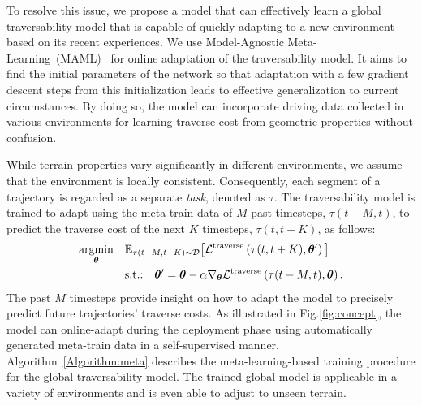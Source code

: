 To resolve this issue, we propose a model that can effectively learn a global traversability model that is capable of quickly adapting to a new environment based on its recent experiences. We use Model-Agnostic Meta-Learning~(MAML)~\cite{finn2017model} for online adaptation of the traversability model. It aims to find the initial parameters of the network so that adaptation with a few gradient descent steps from this initialization leads to effective generalization to current circumstances. By doing so, the model can incorporate driving data collected in various environments for learning traverse cost from geometric properties without confusion.



While terrain properties vary significantly in different environments, we assume that the environment is locally consistent. Consequently, each segment of a trajectory is regarded as a separate \textit{task}, denoted as $\tau$. The traversability model is trained to adapt using the meta-train data of $M$ past timesteps, $\tau\left(t-M,t\right)$, to predict the traverse cost of the next $K$ timesteps, $\tau\left(t,t+K\right)$, as follows: 
\begin{equation}\label{eq:meta}
    \begin{aligned}
    \argmin_{\bm{\theta}} \hspace{10pt} & \mathbb{E}_{\tau\left(t-M, t+K\right) \sim \mathcal{D}}  \big[ \mathcal{L}^{\text{traverse}}\left(\tau(t, t+K), \bm{\theta}'\right)\big] \\   
    & \text{s.t.:} \hspace{10pt} \bm{\theta}' = \bm{\theta} - \alpha \nabla_{\bm{\theta}} \mathcal{L}^{\text{traverse}}\left(\tau(t-M, t), \bm{\theta}\right).
    \end{aligned}
\end{equation} The past $M$ timesteps provide insight on how to adapt the model to precisely predict future trajectories' traverse costs. As illustrated in Fig.\ref{fig:concept}, the model can online-adapt during the deployment phase using automatically generated meta-train data in a self-supervised manner. Algorithm~\ref{Algorithm:meta} describes the meta-learning-based training procedure for the global traversability model. The trained global model is applicable in a variety of environments and is even able to adjust to unseen terrain. 




